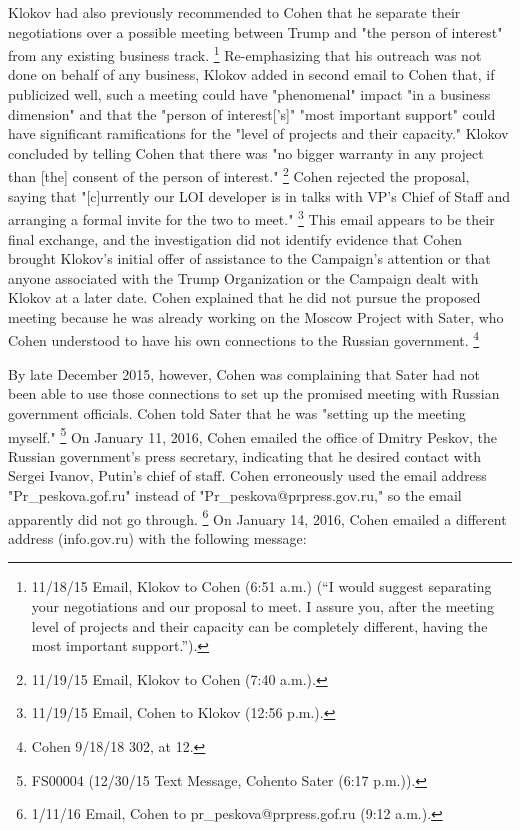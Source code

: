 Klokov had also previously recommended to Cohen that he separate their negotiations over a possible meeting between Trump and "the person of interest" from any existing business track.%
\footnote{11/18/15 Email, Klokov to Cohen (6:51 a.m.) (“I would suggest separating your negotiations and our proposal to meet.
I assure you, after the meeting level of projects and their capacity can be completely different, having the most important support.”).}
Re-emphasizing that his outreach was not done on behalf of any business, Klokov added in second email to Cohen that, if publicized well, such a meeting could have "phenomenal" impact "in a business dimension" and that the "person of interest['s]" "most important support" could have significant ramifications for the "level of projects and their capacity."
Klokov concluded by telling Cohen that there was "no bigger warranty in any project than [the] consent of the person of interest."%
\footnote{11/19/15 Email, Klokov to Cohen (7:40 a.m.).}
Cohen rejected the proposal, saying that "[c]urrently our LOI developer is in talks with VP's Chief of Staff and arranging a formal invite for the two to meet."%
\footnote{11/19/15 Email, Cohen to Klokov (12:56 p.m.).}
This email appears to be their final exchange, and the investigation did not identify evidence that Cohen brought Klokov's initial offer of assistance to the Campaign's attention or that anyone associated with the Trump Organization or the Campaign dealt with Klokov at a later date.
Cohen explained that he did not pursue the proposed meeting because he was already working on the Moscow Project with Sater, who Cohen understood to have his own connections to the Russian government.%
\footnote{Cohen 9/18/18 302, at 12.}

By late December 2015, however, Cohen was complaining that Sater had not been able to use those connections to set up the promised meeting with Russian government officials.
Cohen told Sater that he was "setting up the meeting myself."%
\footnote{FS00004 (12/30/15 Text Message, Cohento Sater (6:17 p.m.)).}
On January 11, 2016, Cohen emailed the office of Dmitry Peskov, the Russian government's press secretary, indicating that he desired contact with Sergei Ivanov, Putin's chief of staff.
Cohen erroneously used the email address "Pr\_peskova\@prpress.gof.ru" instead of "Pr\_peskova@prpress.gov.ru," so the email apparently did not go through.%
\footnote{1/11/16 Email, Cohen to pr_peskova@prpress.gof.ru (9:12 a.m.).}
On January 14, 2016, Cohen emailed a different address (info\@prpress.gov.ru) with the following message:

